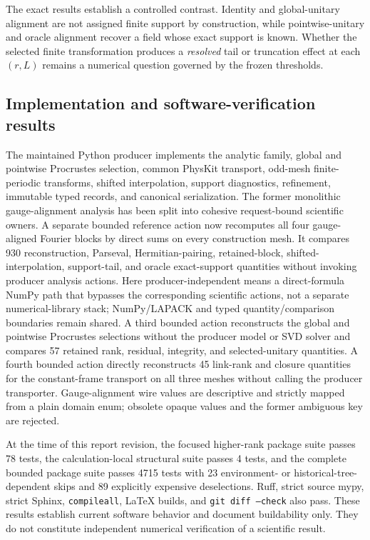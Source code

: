 \documentclass[11pt]{article}
\begin{document}
The exact results establish a controlled contrast. Identity and global-unitary alignment
are not assigned finite support by construction, while pointwise-unitary and oracle
alignment recover a field whose exact support is known. Whether the selected finite
transformation produces a \emph{resolved} tail or truncation effect at each $(r,L)$ remains a
numerical question governed by the frozen thresholds.

\subsection{Implementation and software-verification results}

The maintained Python producer implements the analytic family, global and pointwise
Procrustes selection, common PhysKit transport, odd-mesh finite-periodic transforms,
shifted interpolation, support diagnostics, refinement, immutable typed records, and
canonical serialization. The former monolithic gauge-alignment analysis has been split
into cohesive request-bound scientific owners. A separate bounded reference action now
recomputes all four gauge-aligned Fourier blocks by direct sums on every construction
mesh. It compares 930 reconstruction, Parseval, Hermitian-pairing, retained-block,
shifted-interpolation, support-tail, and oracle exact-support quantities without invoking
producer analysis actions. Here producer-independent means a direct-formula NumPy path that bypasses the
corresponding scientific actions, not a separate numerical-library stack; NumPy/LAPACK
and typed quantity/comparison boundaries remain shared. A third bounded action
reconstructs the global and pointwise Procrustes selections without the producer model or SVD solver and compares 57 retained rank,
residual, integrity, and selected-unitary quantities. A fourth bounded action directly
reconstructs 45 link-rank and closure quantities for the constant-frame transport on all
three meshes without calling the producer transporter. Gauge-alignment wire values are
descriptive and strictly mapped from a plain domain enum; obsolete opaque
values and the former ambiguous key are rejected.

At the time of this report revision, the focused higher-rank package suite passes 78
tests, the calculation-local structural suite passes 4 tests, and the complete bounded
package suite passes 4715 tests with 23 environment- or historical-tree-dependent skips
and 89 explicitly expensive deselections. Ruff, strict source mypy, strict Sphinx,
\texttt{compileall}, LaTeX builds, and \texttt{git diff --check} also pass. These results
establish current software behavior and document buildability only. They do not
constitute independent numerical verification of a scientific result.
\end{document}

